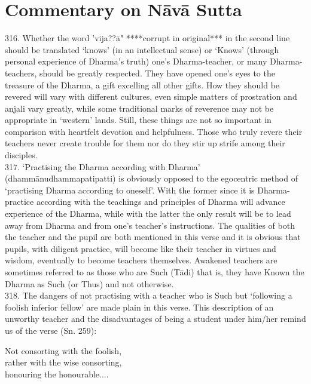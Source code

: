 \newpage

\section{Commentary on N\=av\=a Sutta} 
316. Whether the word 'vija??\=a" ****corrupt in original***  in the second line should be translated
   `knows' (in an intellectual sense) or `Knows' (through personal experience of
   Dharma's truth) one's Dharma-teacher, or many Dharma-teachers, should be greatly respected. They have opened one's eyes to the treasure of the Dharma, a gift excelling all other gifts. How they should be revered will vary with different cultures, even simple matters of prostration and anjali vary greatly, while some
   traditional marks of reverence may not be appropriate in `western' lands. Still, these things are not so important in comparison with heartfelt devotion and helpfulness. Those who truly revere their teachers never create trouble for them nor do they stir up strife among their disciples.\\
   
   317. `Practising the Dharma according with Dharma'
   (dhamm\=anudhammapatipatti) is obviously opposed to the egocentric method of `practising Dharma according to oneself'. With the former since it is Dharma-practice according with the teachings and principles of Dharma will advance experience of the Dharma, while with the latter the only result will be to lead away from Dharma and from one's teacher's instructions. The qualities of both the teacher and the pupil are both mentioned in this verse and it is obvious that pupils, with diligent practice, will become like their teacher in virtues and wisdom, eventually to become teachers themselves. Awakened teachers are sometimes referred to as those who are Such (T\=adi) that is, they have Known the Dharma as Such (or Thus) and not otherwise.\\
   
318. The dangers of not practising with a teacher who is Such but `following a foolish inferior fellow' are made plain in this verse. This description of an unworthy teacher and the disadvantages of being a student under him/her remind us of the verse (Sn. 259):

\begin{MyDescription}[]{}
Not consorting with the foolish,\\
rather with the wise consorting,\\
honouring the honourable....
\end{MyDescription}
   
